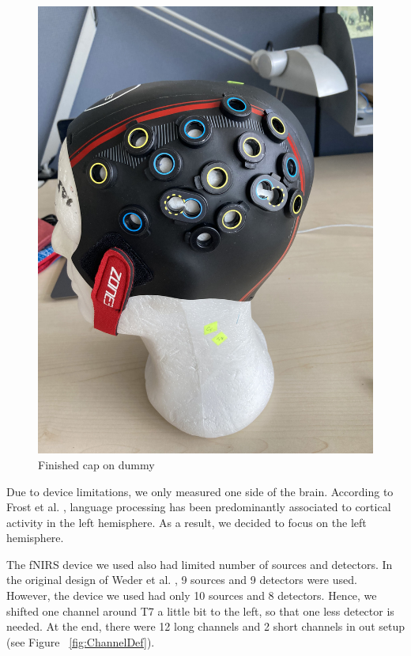 \begin{figure}
\begin{minipage}[c]{.4\linewidth}
  \includegraphics[scale= 0.05, angle= -90, origin= c] {bilder/IMG_9768.jpg}
  \caption{Finished cap on dummy}
  \label{fig:FinishedCap}
\end{minipage}
\end{figure}

Due to device limitations, we only measured one side of the brain. According to Frost et al. \citeyearpar {Frost1999-vs} , language processing has been predominantly associated to cortical activity in the left hemisphere. As a result, we decided to focus on the left hemisphere.

The fNIRS device we used also had limited number of sources and detectors. In the original design of Weder et al. \citeyearpar{Weder2018}, 9 sources and 9 detectors were used. However, the device we used had only 10 sources and 8 detectors. Hence, we shifted one channel around T7 a little bit to the left, so that one less detector is needed. At the end, there were 12 long channels and 2 short channels in out setup (see Figure ~\ref{fig:ChannelDef}).

